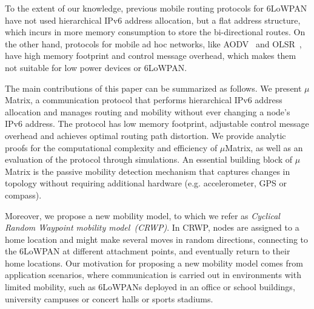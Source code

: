 To the extent of our knowledge, previous mobile routing protocols for 6LoWPAN have not used hierarchical IPv6 address allocation, but a flat address structure, which incurs in more memory consumption to store the bi-directional routes. On the other hand, protocols for mobile ad hoc networks, like AODV~\cite{AODV} and OLSR~\cite{OLSR}, have high memory footprint and control message overhead, which makes them not suitable for low power devices or 6LoWPAN. 

The main contributions of this paper can be summarized as follows. We present $\mu$Matrix, a communication protocol that performs hierarchical IPv6 address allocation and manages routing and mobility without ever changing a node's IPv6 address. The protocol has low memory footprint, adjustable control message overhead and achieves optimal routing path distortion. We provide analytic proofs for the computational complexity and efficiency of $\mu$Matrix, as well as an evaluation of the protocol through simulations. An essential building block of $\mu$Matrix is the passive mobility detection mechanism that captures changes in topology without requiring additional hardware (e.g. accelerometer, GPS or compass).  

Moreover, we propose a new mobility model, to which we refer as \textit{Cyclical Random Waypoint mobility model~(CRWP)}. In CRWP, nodes are assigned to a home location and might make several moves in random directions, connecting to the 6LoWPAN at different attachment points, and eventually return to their home locations. Our motivation for proposing a new mobility model comes from application scenarios, where communication is carried out in environments with limited mobility, such as 6LoWPANs deployed in an office or school buildings, university campuses or concert halls or sports stadiums.